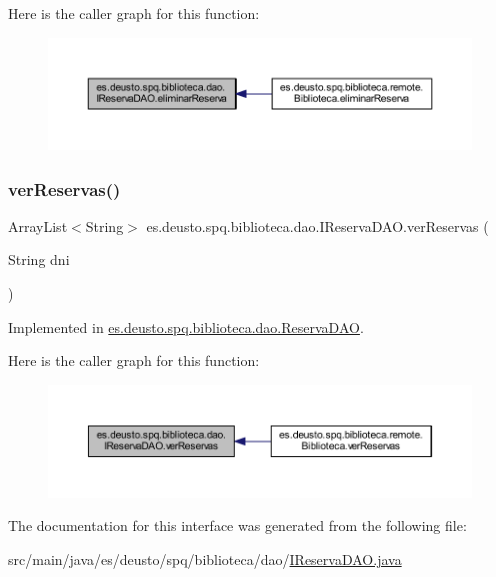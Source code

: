 Here is the caller graph for this function\+:
\nopagebreak
\begin{figure}[H]
\begin{center}
\leavevmode
\includegraphics[width=350pt]{interfacees_1_1deusto_1_1spq_1_1biblioteca_1_1dao_1_1_i_reserva_d_a_o_a696cce84b9719e9e858eec9064daa72f_icgraph}
\end{center}
\end{figure}
\mbox{\label{interfacees_1_1deusto_1_1spq_1_1biblioteca_1_1dao_1_1_i_reserva_d_a_o_aab8b6916e33fd28d632bab5fe2f1801c}} 
\subsubsection{\texorpdfstring{ver\+Reservas()}{verReservas()}}
{\footnotesize\ttfamily Array\+List$<$String$>$ es.\+deusto.\+spq.\+biblioteca.\+dao.\+I\+Reserva\+D\+A\+O.\+ver\+Reservas (\begin{DoxyParamCaption}\item[{String}]{dni }\end{DoxyParamCaption})}



Implemented in \mbox{\hyperlink{classes_1_1deusto_1_1spq_1_1biblioteca_1_1dao_1_1_reserva_d_a_o_a553798fbb62f35db87554e0b431f527b}{es.\+deusto.\+spq.\+biblioteca.\+dao.\+Reserva\+D\+AO}}.

Here is the caller graph for this function\+:
\nopagebreak
\begin{figure}[H]
\begin{center}
\leavevmode
\includegraphics[width=350pt]{interfacees_1_1deusto_1_1spq_1_1biblioteca_1_1dao_1_1_i_reserva_d_a_o_aab8b6916e33fd28d632bab5fe2f1801c_icgraph}
\end{center}
\end{figure}


The documentation for this interface was generated from the following file\+:\begin{DoxyCompactItemize}
\item 
src/main/java/es/deusto/spq/biblioteca/dao/\mbox{\hyperlink{_i_reserva_d_a_o_8java}{I\+Reserva\+D\+A\+O.\+java}}\end{DoxyCompactItemize}
